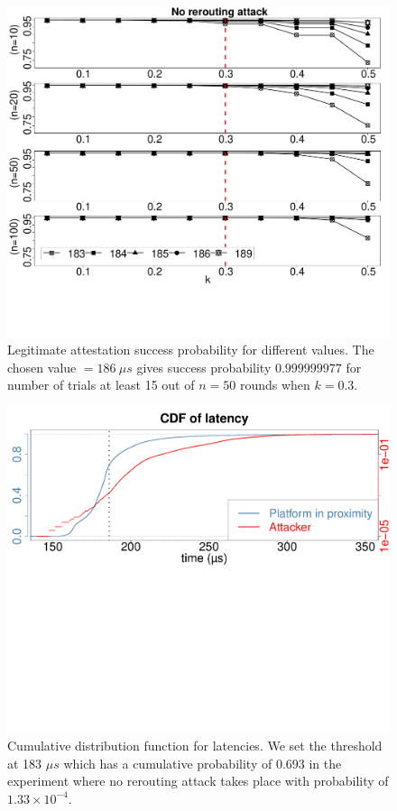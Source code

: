 \begin{figure}[h]
  \centering
    \includegraphics[trim={0 5cm 0 0}, clip, width=\linewidth]{chapters/ProximiTEE/data/fx3_data/timeRound.pdf}
    \caption{Legitimate attestation success probability for different \connect values. The chosen value \connect $=186\ \mu s$ gives success probability $0.999999977$ for number of trials at least 15 out of $n=50$ rounds when $k=0.3$.}
    \label{graph:diffTh}
\end{figure}


\begin{figure}[h]
  \centering

    \includegraphics[trim={0 15cm 0 0}, clip, width=\linewidth]{chapters/ProximiTEE/data/fx3_data/CDF_N.pdf}
    \caption{Cumulative distribution function for latencies. We set the threshold \connect at 183 $\mu s$ which has a cumulative probability of $0.693$ in the experiment where no rerouting attack takes place with probability of $1.33\times10^{-4}$.}
    \label{fig:cdf}
\end{figure}


